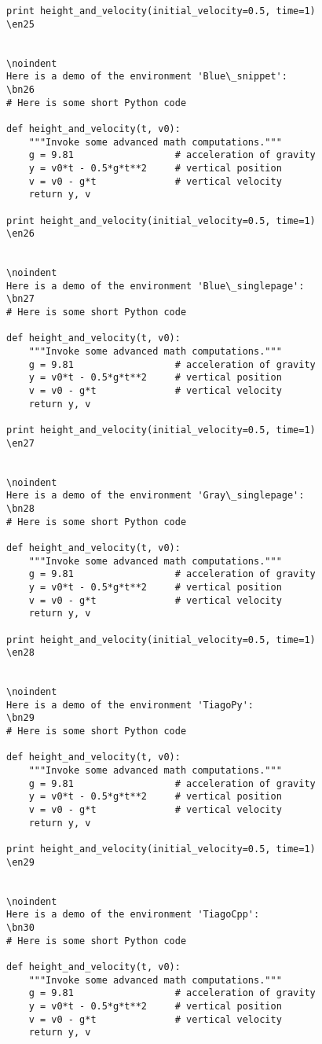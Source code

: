 \documentclass[a4paper,11pt]{article}
\begin{document}
{{{{{{{{{{{\begin{Verbatim}
print height_and_velocity(initial_velocity=0.5, time=1)
\en25


\noindent
Here is a demo of the environment 'Blue\_snippet':
\bn26
# Here is some short Python code

def height_and_velocity(t, v0):
    """Invoke some advanced math computations."""
    g = 9.81                  # acceleration of gravity
    y = v0*t - 0.5*g*t**2     # vertical position
    v = v0 - g*t              # vertical velocity
    return y, v

print height_and_velocity(initial_velocity=0.5, time=1)
\en26


\noindent
Here is a demo of the environment 'Blue\_singlepage':
\bn27
# Here is some short Python code

def height_and_velocity(t, v0):
    """Invoke some advanced math computations."""
    g = 9.81                  # acceleration of gravity
    y = v0*t - 0.5*g*t**2     # vertical position
    v = v0 - g*t              # vertical velocity
    return y, v

print height_and_velocity(initial_velocity=0.5, time=1)
\en27


\noindent
Here is a demo of the environment 'Gray\_singlepage':
\bn28
# Here is some short Python code

def height_and_velocity(t, v0):
    """Invoke some advanced math computations."""
    g = 9.81                  # acceleration of gravity
    y = v0*t - 0.5*g*t**2     # vertical position
    v = v0 - g*t              # vertical velocity
    return y, v

print height_and_velocity(initial_velocity=0.5, time=1)
\en28


\noindent
Here is a demo of the environment 'TiagoPy':
\bn29
# Here is some short Python code

def height_and_velocity(t, v0):
    """Invoke some advanced math computations."""
    g = 9.81                  # acceleration of gravity
    y = v0*t - 0.5*g*t**2     # vertical position
    v = v0 - g*t              # vertical velocity
    return y, v

print height_and_velocity(initial_velocity=0.5, time=1)
\en29


\noindent
Here is a demo of the environment 'TiagoCpp':
\bn30
# Here is some short Python code

def height_and_velocity(t, v0):
    """Invoke some advanced math computations."""
    g = 9.81                  # acceleration of gravity
    y = v0*t - 0.5*g*t**2     # vertical position
    v = v0 - g*t              # vertical velocity
    return y, v


\end{Verbatim}}}}}}}}}}}}
\end{document}

